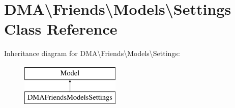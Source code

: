 \hypertarget{classDMA_1_1Friends_1_1Models_1_1Settings}{}\section{D\+M\+A\textbackslash{}Friends\textbackslash{}Models\textbackslash{}Settings Class Reference}
\label{classDMA_1_1Friends_1_1Models_1_1Settings}
Inheritance diagram for D\+M\+A\textbackslash{}Friends\textbackslash{}Models\textbackslash{}Settings\+:\begin{figure}[H]
\begin{center}
\leavevmode
\includegraphics[height=2.000000cm]{d1/d8a/classDMA_1_1Friends_1_1Models_1_1Settings}
\end{center}
\end{figure}
